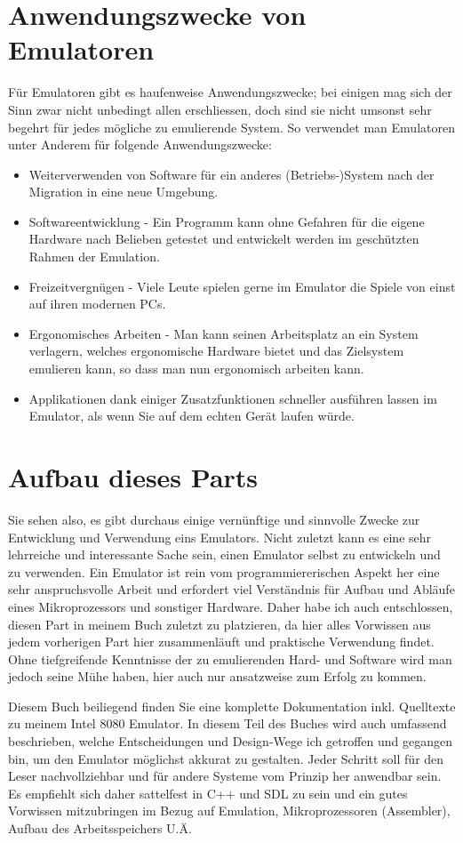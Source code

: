\documentclass[a4paper,10pt,dvips,fleqn,titlepage,twoside]{book}
\begin{document}
\section{Anwendungszwecke von Emulatoren}
Für Emulatoren gibt es haufenweise Anwendungszwecke; bei einigen mag sich der Sinn zwar nicht unbedingt allen erschliessen, doch sind sie nicht umsonst sehr begehrt für jedes mögliche zu emulierende System.
So verwendet man Emulatoren unter Anderem für folgende Anwendungszwecke:
\newline
\begin{itemize}
\item Weiterverwenden von Software für ein anderes (Betriebs-)System nach der Migration in eine neue Umgebung.
\item Softwareentwicklung - Ein Programm kann ohne Gefahren für die eigene Hardware nach Belieben getestet und entwickelt werden im geschützten Rahmen der Emulation.
\item Freizeitvergnügen - Viele Leute spielen gerne im Emulator die Spiele von einst auf ihren modernen PCs.
\item Ergonomisches Arbeiten - Man kann seinen Arbeitsplatz an ein System verlagern, welches ergonomische Hardware bietet und das Zielsystem emulieren kann, so dass man nun ergonomisch arbeiten kann.
\item Applikationen dank einiger Zusatzfunktionen schneller ausführen lassen im Emulator, als wenn Sie auf dem echten Gerät laufen würde.
\end{itemize}
\section{Aufbau dieses Parts}
Sie sehen also, es gibt durchaus einige vernünftige und sinnvolle Zwecke zur Entwicklung und Verwendung eins Emulators.
Nicht zuletzt kann es eine sehr lehrreiche und interessante Sache sein, einen Emulator selbst zu entwickeln und zu verwenden. Ein Emulator ist rein vom programmiererischen Aspekt her eine sehr anspruchsvolle Arbeit und erfordert viel Verständnis für Aufbau und Abläufe eines Mikroprozessors und sonstiger Hardware. Daher habe ich auch entschlossen, diesen Part in meinem Buch zuletzt zu platzieren, da hier alles Vorwissen aus jedem vorherigen Part hier zusammenläuft und praktische Verwendung findet. Ohne tiefgreifende Kenntnisse der zu emulierenden Hard- und Software wird man jedoch seine Mühe haben, hier auch nur ansatzweise zum Erfolg zu kommen.

Diesem Buch beiliegend finden Sie eine komplette Dokumentation inkl. Quelltexte zu meinem Intel 8080 Emulator. In diesem Teil des Buches wird auch umfassend beschrieben, welche Entscheidungen und Design-Wege ich getroffen und gegangen bin, um den Emulator möglichst akkurat zu gestalten. Jeder Schritt soll für den Leser nachvollziehbar und für andere Systeme vom Prinzip her anwendbar sein.\newline
Es empfiehlt sich daher sattelfest in C++ und SDL zu sein und ein gutes Vorwissen mitzubringen im Bezug auf Emulation, Mikroprozessoren (Assembler), Aufbau des Arbeitsspeichers U.Ä.
\end{document}
